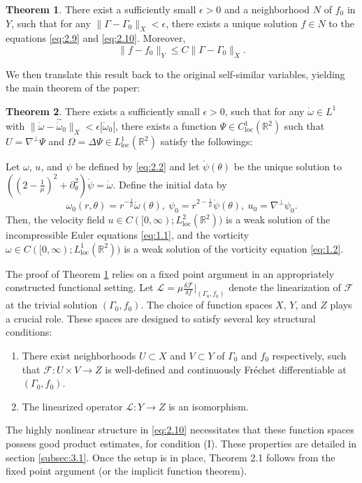 \documentclass[11pt]{article}
\theoremstyle{definition}
\newtheorem{theorem}{Theorem}[section]
\theoremstyle{remark}
\numberwithin{equation}{section}
\newcommand{\mbb}{\mathbb}
\newcommand{\mcal}{\mathcal}
\renewcommand{\hat}{\widehat}
\newcommand{\R}{\mbb{R}}
\newcommand{\del}{\partial}
\newcommand{\grad}{\nabla}
\newcommand{\norm}[1]{\lVert #1 \rVert}
\begin{document}
\begin{theorem} \label{thm:2.1}
There exist a sufficiently small $\epsilon > 0$ and a neighborhood $N$ of $f_0$ in $Y$, such that for any $\norm{\Gamma - \Gamma_0}_{X} < \epsilon$, there exists a unique solution $f\in N$ to the equations \eqref{eq:2.9} and \eqref{eq:2.10}. Moreover,
  \[\norm{f - f_0}_{Y} \leq C \norm{\Gamma - \Gamma_0}_X.\]
\end{theorem}
We then translate this result back to the original self-similar variables, yielding the main theorem of the paper:
\begin{theorem} \label{thm:2.2}
There exists a sufficiently small $\epsilon > 0$, such that for any $\mathring{\omega}\in L^1$ with $\norm{\mathring{\omega} - \hat{\mathring{\omega}}_0}_{X} < \epsilon |\mathring{\omega}_0|$, there exists a function $\Psi \in C^1_{\text{loc}}(\R^2)$ such that $U = \grad^\perp \Psi$ and $\Omega = \Delta\Psi \in L^1_{\text{loc}}(\R^2)$ satisfy the followings:
  
\noindent Let $\omega$, $u$, and $\psi$ be defined by \eqref{eq:2.2} and let $\mathring{\psi}(\theta)$ be the unique solution to $((2 - \frac{1}{\mu})^2 + \del_\theta^2) \mathring{\psi} = \mathring{\omega}$. Define the initial data by
\[\omega_0(r,\theta) = r^{-\frac{1}{\mu}} \mathring{\omega}(\theta), ~\psi_0 = r^{2 - \frac{1}{\mu}} \mathring{\psi}(\theta), ~u_0 = \grad^\perp \psi_0.\]
Then, the velocity field $u \in C([0,\infty); L^2_{\text{loc}}(\R^2))$ is a weak solution of the incompressible Euler equations \eqref{eq:1.1}, and the vorticity $\omega\in C([0,\infty); L^1_{\text{loc}}(\R^2))$ is a weak solution of the vorticity equation \eqref{eq:1.2}.
\end{theorem}

The proof of Theorem \ref{thm:2.1} relies on a fixed point argument in an appropriately constructed functional setting. Let $\mcal{L} = \mu \frac{\delta \mcal{F}}{\delta f} \vert_{(\Gamma_0, f_0)}$ denote the linearization of $\mcal{F}$ at the trivial solution $(\Gamma_0, f_0)$. The choice of function spaces $X$, $Y$, and $Z$ plays a crucial role. These spaces are designed to satisfy several key structural conditions:
\vspace{-.5em}\begin{enumerate}[label=(\Roman*)]
  \item There exist neighborhoods $U \subset X$ and $V \subset Y$ of $\Gamma_0$ and $f_0$ respectively, such that $\mcal{F}: U \times V \to Z$ is well-defined and continuously Fréchet differentiable at $(\Gamma_0, f_0)$.
  \item The linearized operator $\mcal{L}: Y \to Z$ is an isomorphism.
\end{enumerate}
The highly nonlinear structure in \eqref{eq:2.10} necessitates that these function spaces possess good product estimates, for condition (I). These properties are detailed in section \ref{subsec:3.1}. Once the setup is in place, Theorem 2.1 follows from the fixed point argument (or the implicit function theorem).
\end{document}
